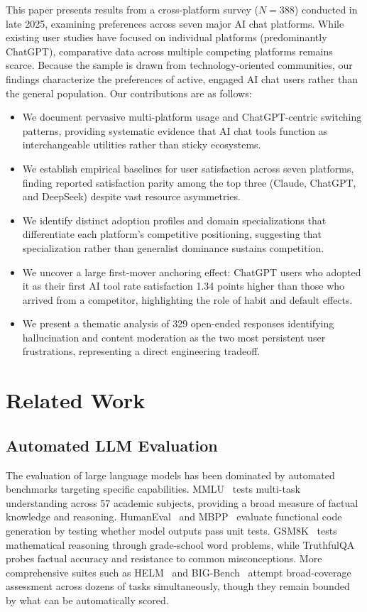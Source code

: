 \documentclass[10pt,twocolumn]{article}
\begin{document}
This paper presents results from a cross-platform survey ($N=388$) conducted in late 2025, examining preferences across seven major AI chat platforms. While existing user studies have focused on individual platforms (predominantly ChatGPT), comparative data across multiple competing platforms remains scarce. Because the sample is drawn from technology-oriented communities, our findings characterize the preferences of active, engaged AI chat users rather than the general population. Our contributions are as follows:

\begin{itemize}
\item We document pervasive multi-platform usage and ChatGPT-centric switching patterns, providing systematic evidence that AI chat tools function as interchangeable utilities rather than sticky ecosystems.
\item We establish empirical baselines for user satisfaction across seven platforms, finding reported satisfaction parity among the top three (Claude, ChatGPT, and DeepSeek) despite vast resource asymmetries.
\item We identify distinct adoption profiles and domain specializations that differentiate each platform's competitive positioning, suggesting that specialization rather than generalist dominance sustains competition.
\item We uncover a large first-mover anchoring effect: ChatGPT users who adopted it as their first AI tool rate satisfaction 1.34 points higher than those who arrived from a competitor, highlighting the role of habit and default effects.
\item We present a thematic analysis of 329 open-ended responses identifying hallucination and content moderation as the two most persistent user frustrations, representing a direct engineering tradeoff.
\end{itemize}


\section{Related Work}

\subsection{Automated LLM Evaluation}

The evaluation of large language models has been dominated by automated benchmarks targeting specific capabilities. MMLU~\cite{hendrycks2021} tests multi-task understanding across 57 academic subjects, providing a broad measure of factual knowledge and reasoning. HumanEval~\cite{chen2021} and MBPP~\cite{austin2021} evaluate functional code generation by testing whether model outputs pass unit tests. GSM8K~\cite{cobbe2021} tests mathematical reasoning through grade-school word problems, while TruthfulQA~\cite{lin2022} probes factual accuracy and resistance to common misconceptions. More comprehensive suites such as HELM~\cite{liang2023} and BIG-Bench~\cite{srivastava2023} attempt broad-coverage assessment across dozens of tasks simultaneously, though they remain bounded by what can be automatically scored.
\end{document}
